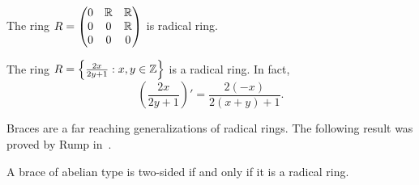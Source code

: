 \begin{example}
    The ring 
    $R=\begin{pmatrix}
    0 & \mathbb{R} & \mathbb{R}\\
    0 & 0 & \mathbb{R}\\
    0 & 0 & 0
    \end{pmatrix}$ 
    is  radical ring. 
\end{example}

\begin{example}
    The ring $R=\left\{\frac{2x}{2y+1}:x,y\in\mathbb{Z}\right\}$ is a radical ring. In fact, 
    \[
    \left(\frac{2x}{2y+1}\right)'=\frac{2(-x)}{2(x+y)+1}.
    \]
\end{example}

Braces are a far reaching generalizations of radical rings. The following result was proved by Rump in~\cite{MR2278047}.

\begin{theorem}
    A brace of abelian type is two-sided if and only if it is a radical ring. 
\end{theorem}

